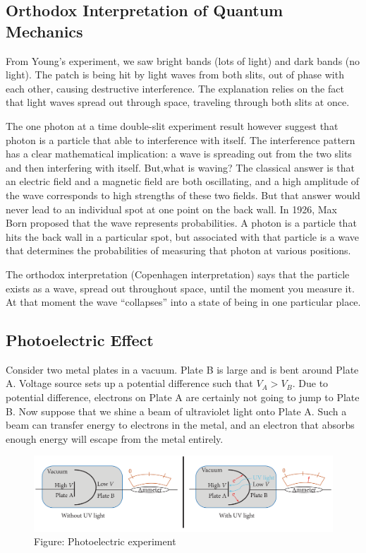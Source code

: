 \documentclass[../main.tex]{subfiles}
\begin{document}
\subsection*{Orthodox Interpretation of Quantum Mechanics}
From Young's experiment, we saw bright bands (lots of light) and dark bands (no light). The patch is being hit by light waves from both slits, out of phase with each other, causing destructive interference. The explanation relies on the fact that light waves spread out through space, traveling through both slits at once. 

The one photon at a time double-slit experiment result however suggest that photon is a particle that able to interference with itself. The interference pattern has a clear mathematical implication: a wave is spreading out from the two slits and then interfering with itself. But,what is waving? The classical answer is that an electric field and a magnetic field are both oscillating, and a high amplitude of the wave corresponds to high strengths of these two fields. But that answer would never lead to an individual spot at one point on the back wall. In 1926, Max Born proposed that the wave represents probabilities. A photon is a particle that hits the back wall in a particular spot, but associated with that particle is a wave that determines the probabilities of measuring that photon at various positions. 

The orthodox interpretation (Copenhagen interpretation) says that the particle exists as a wave, spread out throughout space, until the moment you measure it. At that moment the wave “collapses” into a state of being in one particular place. 

\subsection*{Photoelectric Effect}
Consider two metal plates in a vacuum. Plate B is large and is bent around Plate A. Voltage source sets up a potential difference such that $V_A > V_B$. Due to potential difference, electrons on Plate A are certainly not going to jump to Plate B. Now suppose that we shine a beam of ultraviolet light onto Plate A. Such a beam can transfer energy to electrons in the metal, and an electron that absorbs enough energy will escape from the metal entirely. 

\begin{figure}[b]
    \centering
    \includegraphics[width=\textwidth]{../Rss/QM/Chapter/PhotoElec.png}
    \caption*{Figure: Photoelectric experiment}
\end{figure}
\end{document}
